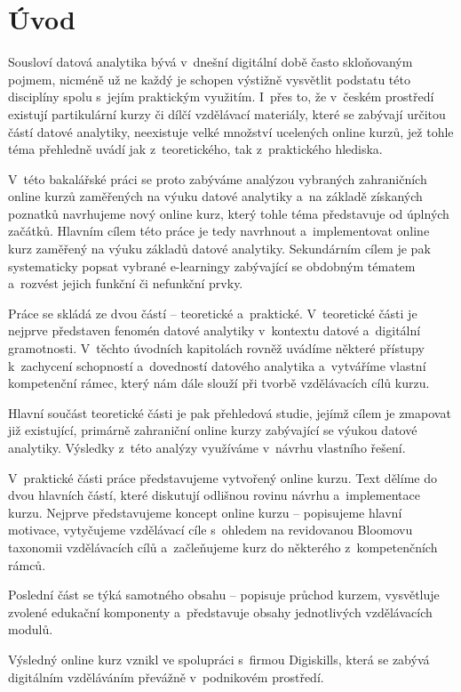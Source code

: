 \hypertarget{uxfavod}{%
\chapter*{Úvod}\label{uvod}}

Sousloví datová analytika bývá v~dnešní digitální době často skloňovaným pojmem, nicméně už ne každý je schopen výstižně vysvětlit podstatu této disciplíny spolu s~jejím praktickým využitím. I~přes to, že v~českém prostředí existují partikulární kurzy či dílčí vzdělávací materiály, které se zabývají určitou částí datové analytiky, neexistuje velké množství ucelených online kurzů, jež tohle téma přehledně uvádí jak z~teoretického, tak z~praktického hlediska.

V~této bakalářské práci se proto zabýváme analýzou vybraných zahraničních online kurzů zaměřených na výuku datové analytiky a~na základě získaných poznatků navrhujeme nový online kurz, který tohle téma představuje od úplných začátků. Hlavním cílem této práce je tedy navrhnout a~implementovat online kurz zaměřený na výuku základů datové analytiky. Sekundárním cílem je pak systematicky popsat vybrané e-learningy zabývající se obdobným tématem a~rozvést jejich funkční či nefunkční prvky.

Práce se skládá ze dvou částí -- teoretické a~praktické. V~teoretické části je nejprve představen fenomén datové analytiky v~kontextu datové a~digitální gramotnosti. V~těchto úvodních kapitolách rovněž uvádíme některé přístupy k~zachycení schopností a~dovedností datového analytika a~vytváříme vlastní kompetenční rámec, který nám dále slouží při tvorbě vzdělávacích cílů kurzu.

Hlavní součást teoretické části je pak přehledová studie, jejímž cílem je zmapovat již existující, primárně zahraniční online kurzy zabývající se výukou datové analytiky. Výsledky z~této analýzy využíváme v~návrhu vlastního řešení.

V~praktické části práce představujeme vytvořený online kurzu. Text dělíme do dvou hlavních částí, které diskutují odlišnou rovinu návrhu a~implementace kurzu. Nejprve představujeme koncept online kurzu -- popisujeme hlavní motivace, vytyčujeme vzdělávací cíle s~ohledem na revidovanou Bloomovu taxonomii vzdělávacích cílů a~začleňujeme kurz do některého z~kompetenčních rámců.

Poslední část se týká samotného obsahu -- popisuje průchod kurzem, vysvětluje zvolené edukační komponenty a~představuje obsahy jednotlivých vzdělávacích modulů.

Výsledný online kurz vznikl ve spolupráci s~firmou Digiskills, která se zabývá digitálním vzděláváním převážně v~podnikovém prostředí.
